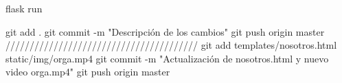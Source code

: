 flask run


git add .
git commit -m "Descripción de los cambios"
git push origin master
////////////////////////////////////////
git add templates/nosotros.html static/img/orga.mp4
git commit -m "Actualización de nosotros.html y nuevo video orga.mp4"
git push origin master

